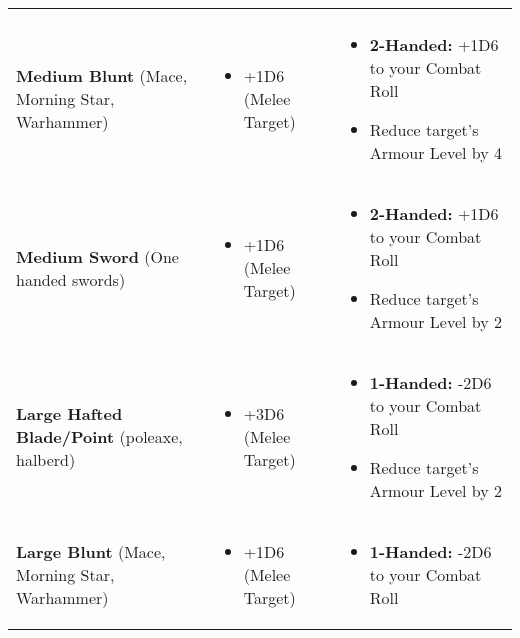 \begin{center}
\begin{xltabular}{\textwidth}{|p{.25\textwidth} p{.3\textwidth} p{.35\textwidth}|}
\begin{itemize}
                \end{itemize} \\
        \raggedright\textbf{Medium Blunt} (Mace, Morning Star, Warhammer) &
            \begin{itemize}
                \item +1D6 (Melee Target)
            \end{itemize} &
                \begin{itemize}
                    \item \textbf{2-Handed:} +1D6 to your Combat Roll
                    \item Reduce target’s Armour Level by 4
                \end{itemize} \\
        \raggedright\textbf{Medium Sword} (One handed swords) &
            \begin{itemize}
                \item +1D6 (Melee Target)
            \end{itemize} &
                \begin{itemize}
                    \item \textbf{2-Handed:} +1D6 to your Combat Roll
                    \item Reduce target’s Armour Level by 2
                \end{itemize} \\
        \raggedright\textbf{Large Hafted Blade/Point} (poleaxe, halberd) &
            \begin{itemize}
                \item +3D6 (Melee Target)
            \end{itemize} &
                \begin{itemize}
                    \item \textbf{1-Handed:} -2D6 to your Combat Roll
                    \item Reduce target’s Armour Level by 2
                \end{itemize} \\
        \raggedright\textbf{Large Blunt} (Mace, Morning Star, Warhammer) &
            \begin{itemize}
                \item +1D6 (Melee Target)
            \end{itemize} &
                \begin{itemize}
                    \item \textbf{1-Handed:} -2D6 to your Combat Roll

\end{itemize}
\end{xltabular}
\end{center}
